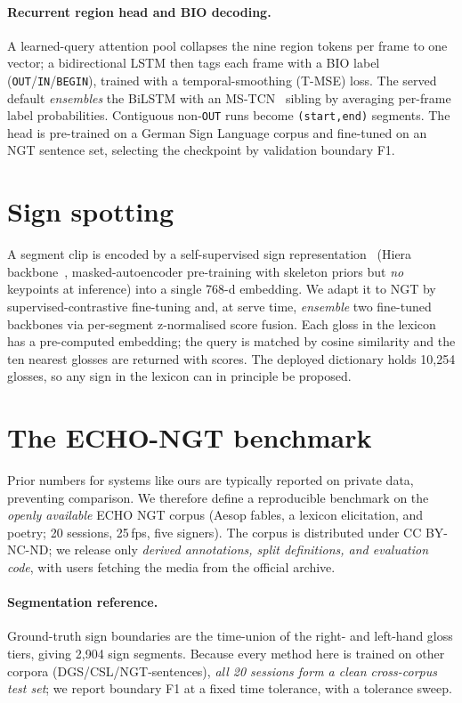 \documentclass[10pt,twocolumn]{article}
\newcommand{\code}[1]{\texttt{\small #1}}
\begin{document}
\paragraph{Recurrent region head and BIO decoding.}
A learned-query attention pool collapses the nine region tokens per frame to one vector; a
bidirectional LSTM then tags each frame with a BIO label (\code{OUT}/\code{IN}/\code{BEGIN}),
trained with a temporal-smoothing (T-MSE) loss. The served default \emph{ensembles} the BiLSTM
with an MS-TCN~\cite{mstcn} sibling by averaging per-frame label probabilities. Contiguous
non-\code{OUT} runs become \code{(start,end)} segments. The head is pre-trained on a German Sign
Language corpus and fine-tuned on an NGT sentence set, selecting the checkpoint by validation
boundary F1.

\section{Sign spotting}
A segment clip is encoded by a self-supervised sign representation~\cite{signrep} (Hiera
backbone~\cite{hiera}, masked-autoencoder pre-training with skeleton priors but \emph{no} keypoints
at inference) into a single 768-d embedding. We adapt it to NGT by supervised-contrastive
fine-tuning and, at serve time, \emph{ensemble} two fine-tuned backbones via per-segment
z-normalised score fusion. Each gloss in the lexicon has a pre-computed embedding; the query is
matched by cosine similarity and the ten nearest glosses are returned with scores. The deployed
dictionary holds 10{,}254 glosses, so any sign in the lexicon can in principle be proposed.

\section{The ECHO-NGT benchmark}
\label{sec:bench}
Prior numbers for systems like ours are typically reported on private data, preventing
comparison. We therefore define a reproducible benchmark on the \emph{openly available} ECHO NGT
corpus (Aesop fables, a lexicon elicitation, and poetry; 20 sessions, 25\,fps, five signers).
The corpus is distributed under CC BY-NC-ND; we release only \emph{derived annotations, split
definitions, and evaluation code}, with users fetching the media from the official archive.
\paragraph{Segmentation reference.} Ground-truth sign boundaries are the time-union of the
right- and left-hand gloss tiers, giving 2{,}904 sign segments. Because every method here is
trained on other corpora (DGS/CSL/NGT-sentences), \emph{all 20 sessions form a clean cross-corpus
test set}; we report boundary F1 at a fixed time tolerance, with a tolerance sweep.
\end{document}
